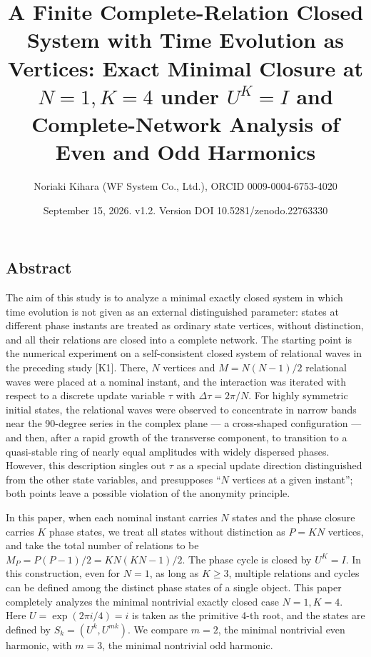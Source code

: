 \documentclass[
  a4paper,
]{article}
\title{A Finite Complete-Relation Closed System with Time Evolution as
Vertices: Exact Minimal Closure at \(N=1, K=4\) under \(U^K=I\) and
Complete-Network Analysis of Even and Odd Harmonics}
\author{Noriaki Kihara (WF System Co., Ltd.), ORCID 0009-0004-6753-4020}
\date{September 15, 2026. v1.2. Version DOI 10.5281/zenodo.22763330}
\begin{document}
\maketitle

\subsection{Abstract}\label{abstract}

The aim of this study is to analyze a minimal exactly closed system in
which time evolution is not given as an external distinguished
parameter: states at different phase instants are treated as ordinary
state vertices, without distinction, and all their relations are closed
into a complete network. The starting point is the numerical experiment
on a self-consistent closed system of relational waves in the preceding
study {[}K1{]}. There, \(N\) vertices and \(M=N(N-1)/2\) relational
waves were placed at a nominal instant, and the interaction was iterated
with respect to a discrete update variable \(\tau\) with
\(\Delta\tau=2\pi/N\). For highly symmetric initial states, the
relational waves were observed to concentrate in narrow bands near the
90-degree series in the complex plane --- a cross-shaped configuration
--- and then, after a rapid growth of the transverse component, to
transition to a quasi-stable ring of nearly equal amplitudes with widely
dispersed phases. However, this description singles out \(\tau\) as a
special update direction distinguished from the other state variables,
and presupposes ``\(N\) vertices at a given instant''; both points leave
a possible violation of the anonymity principle.

In this paper, when each nominal instant carries \(N\) states and the
phase closure carries \(K\) phase states, we treat all states without
distinction as \(P=KN\) vertices, and take the total number of relations
to be \(M_P=P(P-1)/2=KN(KN-1)/2\). The phase cycle is closed by
\(U^K=I\). In this construction, even for \(N=1\), as long as
\(K\ge 3\), multiple relations and cycles can be defined among the
distinct phase states of a single object. This paper completely analyzes
the minimal nontrivial exactly closed case \(N=1, K=4\). Here
\(U=\exp(2\pi i/4)=i\) is taken as the primitive 4-th root, and the
states are defined by \(S_k=(U^k,U^{mk})\). We compare \(m=2\), the
minimal nontrivial even harmonic, with \(m=3\), the minimal nontrivial
odd harmonic.
\end{document}
